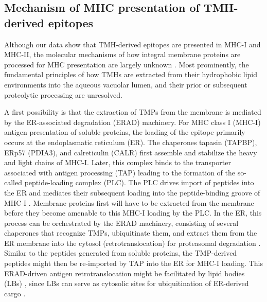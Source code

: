 \subsection{Mechanism of MHC presentation of TMH-derived epitopes}

Although our data show that 
TMH-derived epitopes are presented in MHC-I and MHC-II, 
the molecular mechanisms of how integral membrane proteins are processed 
for MHC presentation are largely unknown \cite{bianchi2017}. 
Most prominently, the fundamental principles of 
how TMHs are extracted from their hydrophobic lipid environments 
into the aqueous vacuolar lumen, 
and their prior or subsequent proteolytic processing are unresolved. 

A first possibility is that the extraction of TMPs from the membrane 
is mediated by the ER-associated degradation (ERAD) machinery. 
For MHC class I (MHC-I) antigen presentation of soluble proteins, 
the loading of the epitope primarily occurs at the endoplasmatic reticulum (ER). 
The chaperones tapasin (TAPBP), ERp57 (PDIA3), 
and calreticulin (CALR) \cite{rock2016present} first assemble 
and stabilize the heavy and light chains of MHC-I. 
Later, this complex binds to the transporter 
associated with antigen processing (TAP) 
leading to the formation of the so-called peptide-loading complex (PLC). 
The PLC drives import of peptides into the ER 
and mediates their subsequent loading into the peptide-binding groove of MHC-I \cite{blees2017structure}. 
Membrane proteins first will have to be extracted from the membrane 
before they become amenable to this MHC-I loading by the PLC. 
In the ER, this process can be orchestrated by the ERAD machinery, 
consisting of several chaperones that recognize TMPs, 
ubiquitinate them, and extract them from the ER membrane 
into the cytosol (retrotranslocation) for proteasomal degradation \cite{preston2017evolving,meusser2005erad}. 
Similar to the peptides generated from soluble proteins, 
the TMP-derived peptides might then be re-imported by TAP 
into the ER for MHC-I loading. 
This ERAD-driven antigen retrotranslocation might be facilitated by lipid bodies (LBs) \cite{bougneres2009role}, 
since LBs can serve as cytosolic sites for ubiquitination of ER-derived cargo \cite{fujimoto2006proteasomal}. 

